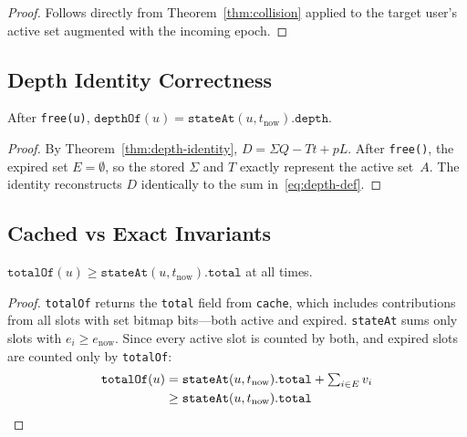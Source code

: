 \documentclass[10pt,a4paper,twocolumn]{article}
\begin{document}
\begin{proof}
Follows directly from Theorem~\ref{thm:collision} applied to the target user's active set augmented with the incoming epoch.
\end{proof}

\subsection{Depth Identity Correctness}

\begin{theorem}
\label{thm:depth-correct}
After \texttt{free(u)}, $\texttt{depthOf}(u) = \texttt{stateAt}(u, t_{\text{now}}).\texttt{depth}$.
\end{theorem}

\begin{proof}
By Theorem~\ref{thm:depth-identity}, $D = \Sigma Q - Tt + pL$. After \texttt{free()}, the expired set $E = \emptyset$, so the stored $\Sigma$ and $T$ exactly represent the active set~$A$. The identity reconstructs $D$ identically to the sum in~\eqref{eq:depth-def}.
\end{proof}

\subsection{Cached vs Exact Invariants}

\begin{theorem}
\label{thm:total-inflation}
$\texttt{totalOf}(u) \geq \texttt{stateAt}(u, t_{\text{now}}).\texttt{total}$ at all times.
\end{theorem}

\begin{proof}
\texttt{totalOf} returns the \texttt{total} field from \texttt{cache}, which includes contributions from all slots with set bitmap bits---both active and expired. \texttt{stateAt} sums only slots with $e_i \geq e_{\text{now}}$. Since every active slot is counted by both, and expired slots are counted only by \texttt{totalOf}:
\begin{align*}
\texttt{totalOf}(u) &= \texttt{stateAt}(u,t_{\text{now}}).\texttt{total} + \textstyle\sum_{i \in E} v_i \\
                     &\geq \texttt{stateAt}(u,t_{\text{now}}).\texttt{total} \qedhere
\end{align*}
\end{proof}
\end{document}
